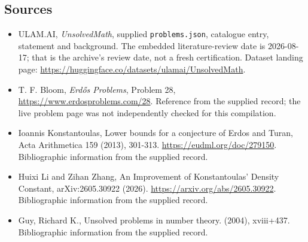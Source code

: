 \documentclass[11pt,a4paper]{article}
\begin{document}
\subsection{Sources}

{\small

\begin{itemize}

\item[\hypertarget{source:statement:1}{S1}] ULAM.AI, \emph{UnsolvedMath}, supplied \texttt{problems.json}, catalogue entry, statement and background. The embedded literature-review date is 2026-08-17; that is the archive’s review date, not a fresh certification. Dataset landing page: \url{https://huggingface.co/datasets/ulamai/UnsolvedMath}.

\item[\hypertarget{source:statement:2}{S2}] T. F. Bloom, \emph{Erdős Problems}, Problem 28, \url{https://www.erdosproblems.com/28}. Reference from the supplied record; the live problem page was not independently checked for this compilation.

\item[\hypertarget{source:statement:3}{S3}] Ioannis Konstantoulas, Lower bounds for a conjecture of Erdos and Turan, Acta Arithmetica 159 (2013), 301-313. \url{https://eudml.org/doc/279150}. Bibliographic information from the supplied record.

\item[\hypertarget{source:statement:4}{S4}] Huixi Li and Zihan Zhang, An Improvement of Konstantoulas' Density Constant, arXiv:2605.30922 (2026). \url{https://arxiv.org/abs/2605.30922}. Bibliographic information from the supplied record.

\item[\hypertarget{source:statement:5}{S5}] Guy, Richard K., Unsolved problems in number theory. (2004), xviii+437. Bibliographic information from the supplied record.

\end{itemize}

}

\label{end:statement}
\end{document}

